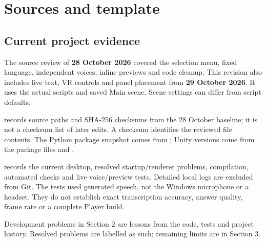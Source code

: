 \section{Sources and template}
\begingroup\footnotesize\raggedright
\subsection{Current project evidence}
The source review of \textbf{28 October 2026} covered the selection menu, fixed
language, independent voices, inline previews and code cleanup. This revision
also includes live text, VR controls and panel placement from \textbf{29 October 2026}.
It uses the actual scripts and saved Main scene. Scene settings can differ from
script defaults.

 records source paths and SHA-256
checksums from the 28 October baseline; it is not a checksum list of later edits.
A checksum identifies the reviewed file contents. The Python package
snapshot comes from ; Unity versions come from
the package files and .

 records the current desktop,
resolved startup/renderer problems, compilation, automated checks and live
voice/preview tests. Detailed local logs are excluded from Git. The tests used
generated speech, not the Windows microphone or a headset. They do not establish
exact transcription accuracy, answer quality, frame rate or a complete Player build.

Development problems in Section 2 are lessons from the code, tests and project
history. Resolved problems are labelled as such; remaining limits are in Section 3.

